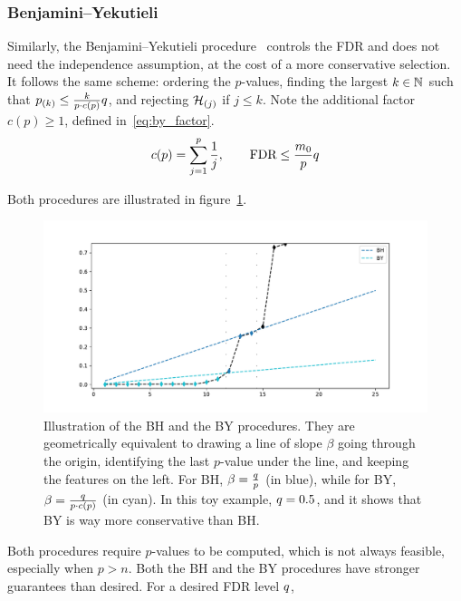 \subsubsection{Benjamini–Yekutieli}\label{subsubsec:by}

Similarly, the Benjamini–Yekutieli procedure~\cite{by} controls the FDR and does not need the independence assumption,
at the cost of a more conservative selection.
It follows the same scheme:
ordering the $p$-values,
finding the largest $k \in \mathbb{N}$ such that $p_{(k)} \leq \frac{k}{p \cdot c(p)}q$,
and rejecting $\mathcal{H}_{(j)}$ if $j \leq k$.
Note the additional factor $c(p) \geq 1$, defined in~\ref{eq:by_factor}.
\begin{equation}\label{eq:by_factor}
        c(p) = \sum_{j = 1}^p \frac{1}{j}
        ,\qquad
        \text{FDR} \leq \frac{m_0}{p}q
\end{equation}


Both procedures are illustrated in figure~\ref{fig:bhy}.
\begin{figure}[h]
        \centering
        \includegraphics[width=1.\textwidth]{figures/bhy.pdf}
        \caption{
                Illustration of the BH and the BY procedures.
                They are geometrically equivalent to drawing a line of slope $\beta$ going through the origin,
                identifying the last $p$-value under the line, and keeping the features on the left.
                For BH, $\beta = \frac{q}{p}$ (in blue),
                while for BY, $\beta = \frac{q}{p \cdot c(p)}$ (in cyan).
                In this toy example, $q = 0.5$, and it shows that BY is way more conservative than BH.
        }
        \label{fig:bhy}
\end{figure}

Both procedures require $p$-values to be computed, which is not always feasible, especially when $p > n$.
Both the BH and the BY procedures have stronger guarantees than desired.
For a desired FDR level $q$,

